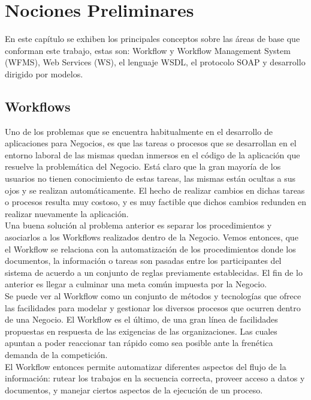 \chapter{Nociones Preliminares}
\label{Nociones Preliminares}


En este capítulo se exhiben los principales conceptos sobre las áreas de base que conforman este trabajo, estas son: Workflow y Workflow Management System (WFMS), Web Services (WS), el lenguaje WSDL, el protocolo SOAP y  desarrollo dirigido por modelos.

\section{Workflows}
\label{Workflows}

Uno de los problemas que se encuentra habitualmente en el desarrollo de aplicaciones para Negocios, es que las tareas o procesos que se desarrollan en el entorno laboral de las mismas quedan inmersos en el código de la aplicación que resuelve la problemática del Negocio. Está claro que la gran mayoría de los usuarios no tienen conocimiento de estas tareas, las mismas están ocultas a sus ojos y se realizan automáticamente. El hecho de realizar cambios en dichas tareas o procesos resulta muy costoso, y es muy factible que dichos cambios redunden en realizar nuevamente la aplicación.\\

Una buena solución al problema anterior es separar los procedimientos y asociarlos a los Workflows realizados dentro de la Negocio. Vemos entonces, que el Workflow se relaciona con la automatización de los procedimientos donde los documentos, la información o tareas son pasadas entre los participantes del sistema de acuerdo a un conjunto de reglas previamente establecidas. El fin de lo anterior es llegar a culminar una meta común impuesta por la Negocio.\\

Se puede ver al Workflow como un conjunto de métodos y tecnologías que ofrece las facilidades para modelar y gestionar los diversos procesos que ocurren dentro de una Negocio. El Workflow es el último, de una gran línea de facilidades propuestas en respuesta de las exigencias de las organizaciones. Las cuales apuntan a poder reaccionar tan rápido como sea posible ante la frenética demanda de la competición.\\

El Workflow entonces permite automatizar diferentes aspectos del flujo de la información: rutear los trabajos en la secuencia correcta, proveer acceso a datos y documentos, y manejar ciertos aspectos de la ejecución de un proceso.\\

